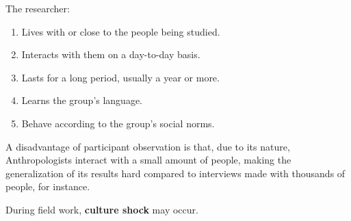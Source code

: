 \documentclass[11pt,a4paper]{book}
\begin{document}
The researcher:

\begin{enumerate}
\item Lives with or close to the people being studied.
\item Interacts with them on a day-to-day basis.
\item Lasts for a long period, usually a year or more.
\item Learns the group's language.
\item Behave according to the group's social norms.
\end{enumerate}

A disadvantage of participant observation is that, due to its nature, Anthropologists interact with a small amount of people, making the generalization of its results hard compared to interviews made with thousands of people, for instance.

During field work, \textbf{culture shock} may occur.
\end{document}
